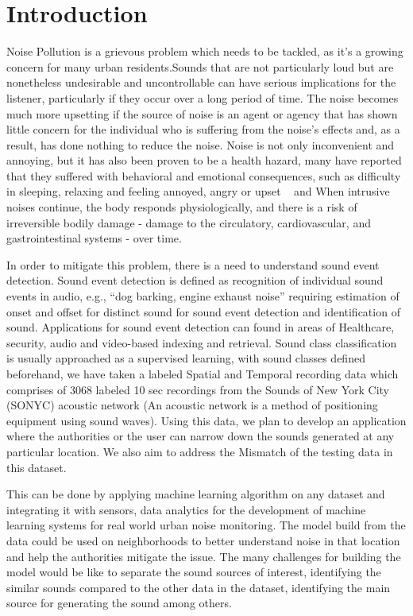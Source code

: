 \section{Introduction}
Noise Pollution is a grievous problem which needs to be tackled, as it’s a growing concern for many urban residents.Sounds that are not particularly loud but are nonetheless undesirable and uncontrollable can have serious implications for the listener, particularly if they occur over a long period of time. The noise becomes much more upsetting if the source of noise is an agent or agency that has shown little concern for the individual who is suffering from the noise's effects and, as a result, has done nothing to reduce the noise. Noise is not only inconvenient and annoying, but it has also been proven to be a health hazard, many have reported that they suffered with behavioral and emotional consequences, such as difficulty in sleeping, relaxing and feeling annoyed, angry or upset ~\cite{1,2,3} and When intrusive noises continue, the body responds physiologically, and there is a risk of irreversible bodily damage - damage to the circulatory, cardiovascular, and gastrointestinal systems - over time.


 In order to mitigate this problem, there is a need to understand sound event detection. Sound event detection is defined as recognition of individual sound events in audio, e.g., “dog barking, engine exhaust noise” requiring estimation of onset and offset for distinct sound for sound event detection and identification of sound. Applications for sound event detection can found in areas of Healthcare, security, audio and video-based indexing and retrieval. Sound class classification is usually approached as a supervised learning, with sound classes defined beforehand, we have taken a labeled Spatial and Temporal recording data which comprises of 3068 labeled 10 sec recordings from the Sounds of New York City (SONYC) acoustic network (An acoustic network is a method of positioning equipment using sound waves). Using this data, we plan to develop an application where the authorities or the user can narrow down the sounds generated at any particular location. We also aim to address the Mismatch of the testing data in this dataset.

This can be done by applying machine learning algorithm on any dataset and integrating it with sensors, data analytics for the development of machine learning systems for real world urban noise monitoring. The model build from the data could be used on neighborhoods to better understand noise in that location and help the authorities mitigate the issue. The many challenges for building the model would be like to separate the sound sources of interest, identifying the similar sounds compared to the other data in the dataset, identifying the main source for generating the sound among others.   